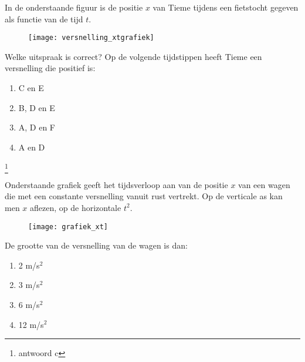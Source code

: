 \documentclass{ximera}
\begin{document}
\begin{exercise} In de onderstaande figuur is de positie $x$ van Tieme tijdens een fietstocht
gegeven als functie van de tijd $t$.
\begin{figure}[h]
\begin{center}
\texttt{[image: versnelling\_xtgrafiek]}
\end{center}
\end{figure}
\newline
Welke uitspraak is correct? Op de volgende tijdstippen heeft Tieme
een versnelling die positief is:
\begin{enumerate}
\item C en E
\item B, D en E
\item A, D en F
\item A en D
\end{enumerate}
\footnote{antwoord c}

\end{exercise}

\begin{exercise} Onderstaande grafiek geeft het
tijdsverloop aan van de positie $x$ van een wagen die met een
constante versnelling vanuit rust vertrekt. Op de verticale as kan
men $x$ aflezen, op de horizontale $t^2$.
\begin{figure}[h]
\begin{center}
\texttt{[image: grafiek\_xt]}
\end{center}
\end{figure}
\newline
De grootte van de versnelling van de wagen is dan:
\begin{enumerate}
\item 2 m/s$^2$
\item 3 m/s$^2$
\item 6 m/s$^2$
\item 12 m/s$^2$
\end{enumerate}



\end{exercise}
\end{document}
